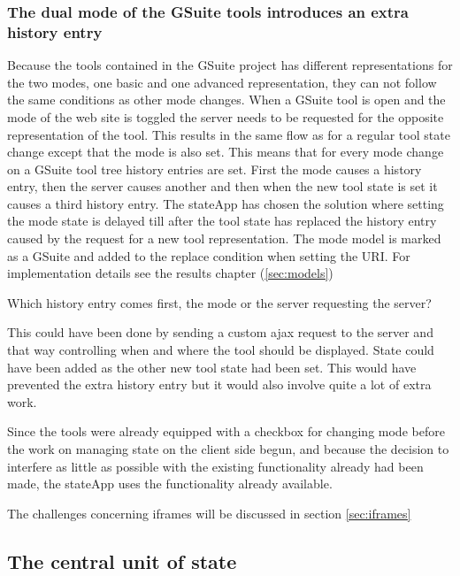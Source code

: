 \documentclass[english]{ifimaster}
\begin{document}
\subsubsection{The dual mode of the GSuite tools introduces an extra history entry}
Because the tools contained in the GSuite project has different representations for the two modes, one basic and one advanced representation, they can not follow the same conditions as other mode changes. When a GSuite tool is open and the mode of the web site is toggled the server needs to be requested for the opposite representation of the tool. This results in the same flow as for a regular tool state change except that the mode is also set. This means that for every mode change on a GSuite tool tree history entries are set. First the mode causes a history entry, then the server causes another and then when the new tool state is set it causes a third history entry. The stateApp has chosen the solution where setting the mode state is delayed till after the tool state has replaced the history entry caused by the request for a new tool representation. The mode model is marked as a GSuite and added to the replace condition when setting the URI. For implementation details see the results chapter (\ref{sec:models})

Which history entry comes first, the mode or the server requesting the server?

This could have been done by sending a custom ajax request to the server and that way controlling when and where the tool should be displayed. State could have been added as the other new tool state had been set. This would have prevented the extra history entry but it would also involve quite a lot of extra work. 

Since the tools were already equipped with a checkbox for changing mode before the work on managing state on the client side begun, and because the decision to interfere as little as possible with the existing functionality already had been made, the stateApp uses the functionality already available. 

The challenges concerning iframes will be discussed in section \ref{sec:iframes}

\subsection{The central unit of state}
\label{sec:modelVSuri} 
\end{document}
